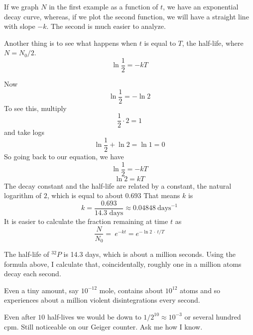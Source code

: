 \documentclass[11pt, oneside]{article}
\begin{document}
If we graph $N$ in the first example as a function of $t$, we have an exponential decay curve, whereas, if we plot the second function, we will have a straight line with slope $-k$.  The second is much easier to analyze.

Another thing is to see what happens when $t$ is equal to $T$, the half-life, where $N = N_0/2$.  
\[ \ln \frac{1}{2} = - kT \]

Now
\[ \ln \frac{1}{2} = - \ln 2 \]
To see this, multiply 
\[ \frac{1}{2} \cdot 2 = 1 \]
and take logs
\[ \ln \frac{1}{2} + \ln 2 = \ln 1 = 0 \]
So going back to our equation, we have
\[ \ln \frac{1}{2} = - kT \]
\[ \ln 2 = kT \]
The decay constant and the half-life are related by a constant, the natural logarithm of $2$, which is equal to about $0.693$  That means $k$ is
\[ k = \frac{0.693}{14.3 \text{ days}} \approx 0.04848 \ \text{days}^{-1} \]
It is easier to calculate the fraction remaining at time $t$ as
\[ \frac{N}{N_0} = \ e^{-kt} = e^{- \ln 2 \ \cdot \ t/T} \]

The half-life of $^{32}P$ is 14.3 days, which is about a million seconds.  Using the formula above, I calculate that, coincidentally, roughly one in a million atoms decay each second.  

Even a tiny amount, say $10^{-12}$ mole, contains  about $10^{12}$ atoms and so experiences about a million violent disintegrations every second.

Even after $10$ half-lives we would be down to $1/2^{10} \approx 10^{-3}$ or several hundred cpm.  Still noticeable on our Geiger counter.  Ask me how I know.
\end{document}
